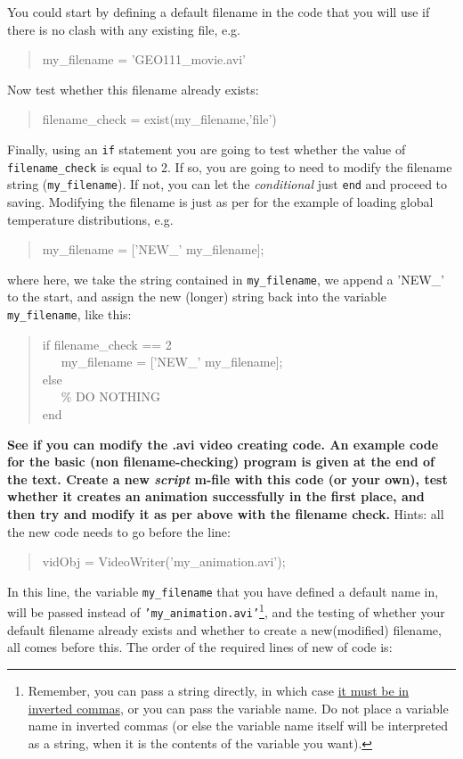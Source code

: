 \documentclass{tufte-book} %
\newenvironment{docspec}{\begin{quotation}\ttfamily\parskip0pt\parindent0pt\ignorespaces}{\end{quotation}}
\begin{document}
You could start by defining a default filename in the code that you will use if there is no clash with any existing file, e.g.
\begin{docspec}
my\_filename = 'GEO111\_movie.avi'
\end{docspec}
Now test whether this filename already exists:
\begin{docspec}
filename\_check = exist(my\_filename,'file')
\end{docspec}
Finally, using an \texttt{if} statement you are going to test whether the value of \texttt{filename\_check} is equal to 2. If so, you are going to need to modify the filename string (\texttt{my\_filename}). If not, you can let the \textit{conditional} just \texttt{end} and proceed to saving. Modifying the filename is just as per for the example of loading global temperature distributions, e.g.
\begin{docspec}
my\_filename = ['NEW\_' my\_filename];
\end{docspec}
where here, we take the string contained in \texttt{my\_filename}, we append a 'NEW\_' to the start, and assign the new (longer) string back into the variable \texttt{my\_filename}, like this:

\begin{docspec}
if filename\_check == 2
\\ \ \ \ my\_filename = ['NEW\_' my\_filename];
\\else
\\ \ \ \ \% DO NOTHING
\\end
\end{docspec}

\textbf{See if you can modify the \textsf{.avi} video creating code. An example code for the basic (non filename-checking) program is given at the end of the text. Create a new \textit{script} m-file with this code (or your own),  test whether it creates an animation successfully in the first place, and then try and modify it as per above with the filename check.} Hints: all the new code needs to go before the line:

\begin{docspec}
vidObj = VideoWriter('my\_animation.avi');
\end{docspec}

In this line,  the variable \texttt{my\_filename} that you have defined a default name in, will be passed instead of \texttt{'my\_animation.avi'}\footnote{Remember, you can pass a string directly, in which case \uline{it must be in inverted commas}, or you can pass the variable name. Do not place a variable name in inverted commas (or else the variable name itself will be interpreted as a string, when it is the contents of the variable you want).}, and the testing of whether your default filename already exists and whether to create a new(modified) filename, all comes before this. The order of the required lines of new of code is:
\end{document}

